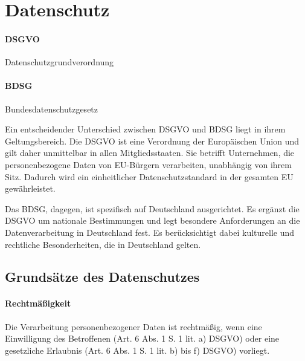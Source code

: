 \section{Datenschutz}
\label{sec:Datenschutz}

\paragraph{DSGVO} Datenschutzgrundverordnung

\paragraph{BDSG} Bundesdatenschutzgesetz


\begin{center}
\end{center}


Ein entscheidender Unterschied zwischen DSGVO und BDSG liegt in ihrem Geltungsbereich. Die DSGVO ist eine Verordnung der Europäischen Union und gilt daher unmittelbar in allen Mitgliedsstaaten. Sie betrifft Unternehmen, die personenbezogene Daten von EU-Bürgern verarbeiten, unabhängig von ihrem Sitz. Dadurch wird ein einheitlicher Datenschutzstandard in der gesamten EU gewährleistet.

Das BDSG, dagegen, ist spezifisch auf Deutschland ausgerichtet. Es ergänzt die DSGVO um nationale Bestimmungen und legt besondere Anforderungen an die Datenverarbeitung in Deutschland fest. Es berücksichtigt dabei kulturelle und rechtliche Besonderheiten, die in Deutschland gelten.

\subsection{Grundsätze des Datenschutzes}
\label{sec:GrundsaetzeDesDatenschutzes}


\paragraph{Rechtmäßigkeit} Die Verarbeitung personenbezogener Daten ist rechtmäßig, wenn eine Einwilligung des Betroffenen (Art. 6 Abs. 1 S. 1 lit. a) DSGVO) oder eine gesetzliche Erlaubnis (Art. 6 Abs. 1 S. 1 lit. b) bis f) DSGVO) vorliegt.

